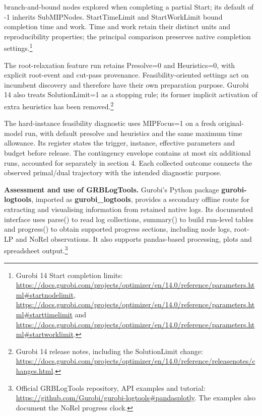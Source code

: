 \documentclass[
  british,
  10pt,
]{article}
\begin{document}
\begin{itemize}
  branch-and-bound nodes explored when completing a partial Start; its
  default of -1 inherits SubMIPNodes. StartTimeLimit and StartWorkLimit
  bound completion time and work. Time and work retain their distinct
  units and reproducibility properties; the principal comparison
  preserves native completion settings.\footnote{Gurobi 14 Start
    completion limits:
    \url{https://docs.gurobi.com/projects/optimizer/en/14.0/reference/parameters.html\#startnodelimit},
    \url{https://docs.gurobi.com/projects/optimizer/en/14.0/reference/parameters.html\#starttimelimit}
    and
    \url{https://docs.gurobi.com/projects/optimizer/en/14.0/reference/parameters.html\#startworklimit}.}
\end{itemize}

The root-relaxation feature run retains Presolve=0 and Heuristics=0,
with explicit root-event and cut-pass provenance. Feasibility-oriented
settings act on incumbent discovery and therefore have their own
preparation purpose. Gurobi 14 also treats SolutionLimit=1 as a stopping
rule; its former implicit activation of extra heuristics has been
removed.\footnote{Gurobi 14 release notes, including the SolutionLimit
  change:
  \url{https://docs.gurobi.com/projects/optimizer/en/14.0/reference/releasenotes/changes.html}.}

The hard-instance feasibility diagnostic uses MIPFocus=1 on a fresh
original-model run, with default presolve and heuristics and the same
maximum time allowance. Its register states the trigger, instance,
effective parameters and budget before release. The contingency envelope
contains at most six additional runs, accounted for separately in
section 4. Each collected outcome connects the observed primal/dual
trajectory with the intended diagnostic purpose.

\textbf{Assessment and use of GRBLogTools.} Gurobi's Python package
\textbf{gurobi-logtools}, imported as \textbf{gurobi\_logtools},
provides a secondary offline route for extracting and visualising
information from retained native logs. Its documented interface uses
parse() to read log collections, summary() to build run-level tables and
progress() to obtain supported progress sections, including node logs,
root-LP and NoRel observations. It also supports pandas-based
processing, plots and spreadsheet output.\footnote{Official GRBLogTools
  repository, API examples and tutorial:
  \url{https://github.com/Gurobi/gurobi-logtools\#pandasplotly}. The
  examples also document the NoRel progress clock.}
\end{document}
